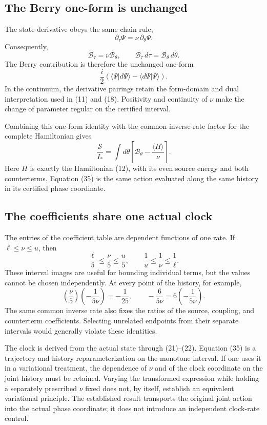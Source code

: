 \documentclass[10pt,twocolumn,letterpaper]{article}
\begin{document}
\subsection{The Berry one-form is unchanged}
The state derivative obeys the same chain rule,
\[
\partial_\tau\Psi=\nu\,\partial_\theta\Psi.
\]
Consequently,
\[
\mathcal B_\tau=\nu\mathcal B_\theta,
\qquad
\mathcal B_\tau\,d\tau=\mathcal B_\theta\,d\theta.
\]
The Berry contribution is therefore the unchanged one-form
\begin{equation}
\frac{i}{2}(\langle\Psi|d\Psi\rangle-\langle d\Psi|\Psi\rangle).\tag{34}\label{eq:clock-berry}
\end{equation}
In the continuum, the derivative pairings retain the form-domain and dual interpretation used in (11) and (18). Positivity and continuity of $\nu$ make the change of parameter regular on the certified interval.

Combining this one-form identity with the common inverse-rate factor for the complete Hamiltonian gives
\begin{equation}
\frac{\mathcal S}{I_*}=\int d\theta\left[\mathcal B_\theta-\frac{\langle H\rangle}{\nu}\right].\tag{35}\label{eq:clock-phase-action}
\end{equation}
Here $H$ is exactly the Hamiltonian (12), with its even source energy and both counterterms. Equation (35) is the same action evaluated along the same history in its certified phase coordinate.

\subsection{The coefficients share one actual clock}
The entries of the coefficient table are dependent functions of one rate. If $\ell\le\nu\le u$, then
\[
\frac{\ell}{5}\le\frac{\nu}{5}\le\frac{u}{5},
\qquad
\frac1u\le\frac1\nu\le\frac1\ell.
\]
These interval images are useful for bounding individual terms, but the values cannot be chosen independently. At every point of the history, for example,
\[
\left(\frac{\nu}{5}\right)
\left(-\frac{1}{5\nu}\right)=-\frac1{25},
\qquad
-\frac{6}{5\nu}=6\left(-\frac{1}{5\nu}\right).
\]
The same common inverse rate also fixes the ratios of the source, coupling, and counterterm coefficients. Selecting unrelated endpoints from their separate intervals would generally violate these identities.

The clock is derived from the actual state through (21)--(22). Equation (35) is a trajectory and history reparameterization on the monotone interval. If one uses it in a variational treatment, the dependence of $\nu$ and of the clock coordinate on the joint history must be retained. Varying the transformed expression while holding a separately prescribed $\nu$ fixed does not, by itself, establish an equivalent variational principle. The established result transports the original joint action into the actual phase coordinate; it does not introduce an independent clock-rate control.
\end{document}
